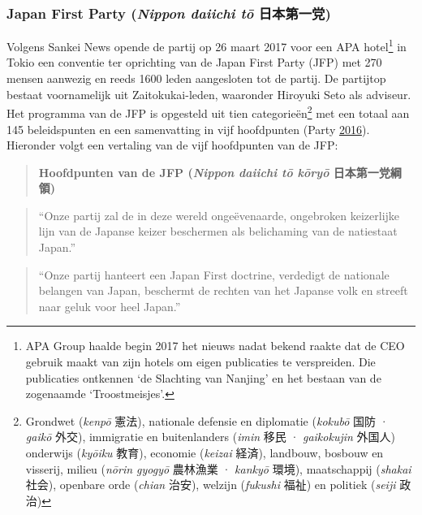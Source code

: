 \documentclass[10.5pt,dutch,]{article}
\begin{document}
\subsubsection{\texorpdfstring{Japan First Party (\emph{Nippon daiichi
tō}
日本第一党)}{Japan First Party (Nippon daiichi tō 日本第一党)}}\label{japan-first-party-nippon-daiichi-tux14d-ux65e5ux672cux7b2cux4e00ux515a}

Volgens Sankei News opende de partij op 26 maart 2017 voor een APA
hotel\footnote{APA Group haalde begin 2017 het nieuws nadat bekend
  raakte dat de CEO gebruik maakt van zijn hotels om eigen publicaties
  te verspreiden. Die publicaties ontkennen `de Slachting van Nanjing'
  en het bestaan van de zogenaamde `Troostmeisjes'.} in Tokio een
conventie ter oprichting van de Japan First Party (JFP) met 270 mensen
aanwezig en reeds 1600 leden aangesloten tot de partij. De partijtop
bestaat voornamelijk uit Zaitokukai-leden, waaronder Hiroyuki Seto als
adviseur. Het programma van de JFP is opgesteld uit tien
categorieën\footnote{Grondwet (\emph{kenpō} 憲法), nationale defensie en
  diplomatie (\emph{kokubō} 国防 · \emph{gaikō} 外交), immigratie en
  buitenlanders (\emph{imin} 移民 · \emph{gaikokujin} 外国人) onderwijs
  (\emph{kyōiku} 教育), economie (\emph{keizai} 経済), landbouw, bosbouw
  en visserij, milieu (\emph{nōrin gyogyō} 農林漁業 · \emph{kankyō}
  環境), maatschappij (\emph{shakai} 社会), openbare orde (\emph{chian}
  治安), welzijn (\emph{fukushi} 福祉) en politiek (\emph{seiji} 政治)}
met een totaal aan 145 beleidspunten en een samenvatting in vijf
hoofdpunten (Party
\protect\hyperlink{ref-japanux5ffirstux5fpartyux5fjapanux5f2016}{2016}).
Hieronder volgt een vertaling van de vijf hoofdpunten van de JFP:

\begin{quote}
\textbf{Hoofdpunten van de JFP (\emph{Nippon daiichi tō kōryō}
日本第一党綱領)}
\end{quote}

\begin{quote}
``Onze partij zal de in deze wereld ongeëvenaarde, ongebroken
keizerlijke lijn van de Japanse keizer beschermen als belichaming van de
natiestaat Japan.''
\end{quote}

\begin{quote}
``Onze partij hanteert een Japan First doctrine, verdedigt de nationale
belangen van Japan, beschermt de rechten van het Japanse volk en streeft
naar geluk voor heel Japan.''
\end{quote}
\end{document}
